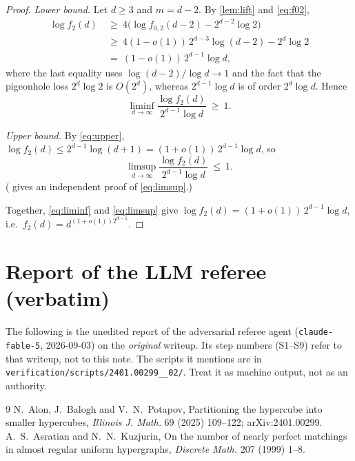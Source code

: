 \documentclass[11pt,a4paper]{article}
\theoremstyle{plain}
\theoremstyle{definition}
\theoremstyle{remark}
\begin{document}
\label{pf:main}
\thmmain*
\begin{proof}
\emph{Lower bound.} Let $d\ge3$ and $m=d-2$. By \cref{lem:lift} and \eqref{eq:f02},
\begin{align*}
 \log f_2(d)&\ \ge\ 4\bigl(\log f_{0,2}(d-2)-2^{d-2}\log2\bigr)\\
 &\ \ge\ 4(1-o(1))\,2^{d-3}\log(d-2)-2^{d}\log2\\
 &\ =\ (1-o(1))\,2^{d-1}\log d,
\end{align*}
where the last equality uses $\log(d-2)/\log d\to1$ and the fact that the pigeonhole loss $2^d\log2$ is $O(2^d)$, whereas $2^{d-1}\log d$ is of order $2^d\log d$. Hence
\begin{equation}\label{eq:liminf}
 \liminf_{d\to\infty}\frac{\log f_2(d)}{2^{d-1}\log d}\ \ge\ 1 .
\end{equation}

\emph{Upper bound.} By \eqref{eq:upper}, $\log f_2(d)\le2^{d-1}\log(d+1)=(1+o(1))\,2^{d-1}\log d$, so
\begin{equation}\label{eq:limsup}
 \limsup_{d\to\infty}\frac{\log f_2(d)}{2^{d-1}\log d}\ \le\ 1 .
\end{equation}
( gives an independent proof of \eqref{eq:limsup}.)

Together, \eqref{eq:liminf} and \eqref{eq:limsup} give $\log f_2(d)=(1+o(1))\,2^{d-1}\log d$, i.e.\ $f_2(d)=d^{(1+o(1))2^{d-1}}$.
\end{proof}

\section{Report of the LLM referee (verbatim)}\label{app:referee}

\begin{tcolorbox}[colback=gray!8,colframe=gray!50,boxrule=0.4pt,arc=2pt]
\small The following is the unedited report of the adversarial referee agent (\texttt{claude-fable-5}, 2026-09-03) on the \emph{original} writeup. Its step numbers (S1--S9) refer to that writeup, not to this note. The scripts it mentions are in \texttt{verification/scripts/2401.00299\_\_02/}. Treat it as machine output, not as an authority.
\end{tcolorbox}



\begin{thebibliography}{9}
 N.~Alon, J.~Balogh and V.~N.~Potapov, Partitioning the hypercube into smaller hypercubes, \emph{Illinois J. Math.} 69 (2025) 109--122; arXiv:2401.00299.
 A.~S.~Asratian and N.~N.~Kuzjurin, On the number of nearly perfect matchings in almost regular uniform hypergraphs, \emph{Discrete Math.} 207 (1999) 1--8.
\end{thebibliography}
\end{document}
